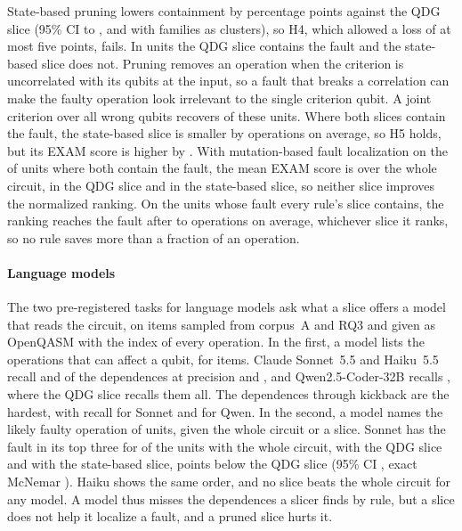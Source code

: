 State-based pruning lowers containment by \numHFourDiffAbs{} percentage points against the QDG slice
(95\% CI \numHFourCILow{} to \numHFourCIHigh{}, and \numCcHFour{} with families as clusters), so H4,
which allowed a loss of at most five points, fails.
In \numCQFour{} units the QDG slice contains the fault and the state-based slice does not. Pruning removes
an operation when the criterion is uncorrelated with its qubits at the input, so a fault that breaks a
correlation can make the faulty operation look irrelevant to the single criterion qubit. A joint criterion
over all wrong qubits recovers \numCQFourRecovered{} of these units. Where both slices contain the fault,
the state-based slice is smaller by \numHFiveSizeDiff{} operations on average, so H5 holds, but its EXAM
score is higher by \numHFiveExamQHigher{}. With mutation-based fault localization on the \numMbflPairedN{}
of \numMbflUnits{} units where both contain the fault, the mean EXAM score is \numMbflPairedAll{}
over the whole circuit, \numMbflPairedLc{} in the QDG slice and \numMbflPairedQ{} in the state-based
slice, so neither slice improves the normalized ranking. On the \numMbflAllN{} units whose fault every rule's slice contains, the ranking reaches the fault
after \numMbflAllExaminedMin{} to \numMbflAllExaminedMax{} operations on average, whichever slice it ranks,
so no rule saves more than a fraction of an operation.

\paragraph*{Language models}
The two pre-registered tasks for language models ask what a slice offers a model that reads the circuit,
on items sampled from corpus~A and RQ3 and given as OpenQASM with the index of every operation. In the first,
a model lists the operations that can affect a qubit, for \numTOneItems{} items. Claude Sonnet~5.5 and
Haiku~5.5 recall \numTOneSonnetRecall{} and \numTOneHaikuRecall{} of the dependences at precision
\numTOneSonnetPrec{} and \numTOneHaikuPrec{}, and Qwen2.5-Coder-32B recalls \numTOneQwenMidRecall{}, where the
QDG slice recalls them all. The dependences through kickback are the hardest, with recall
\numTOneSonnetKick{} for Sonnet and \numTOneQwenMidKick{} for Qwen. In the second, a model names the likely
faulty operation of \numTTwoItems{} units, given the whole circuit or a slice. Sonnet has the fault in its top
three for \numTTwoSonnetFull{} of the units with the whole circuit, \numTTwoSonnetLc{} with the QDG slice and
\numTTwoSonnetQ{} with the state-based slice, \numTTwoSonnetQVsLcLoss{} points below the QDG slice (95\% CI
\numTTwoSonnetQVsLcCI{}, exact McNemar \numTTwoSonnetQVsLcP{}). Haiku shows the same order, and no slice beats
the whole circuit for any model. A model thus misses the dependences a slicer finds by rule, but a slice does
not help it localize a fault, and a pruned slice hurts it.

